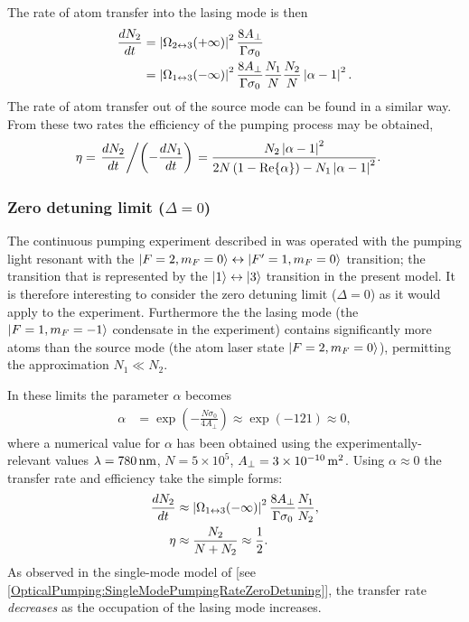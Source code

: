 The rate of atom transfer into the lasing mode is then
\begin{align}
    \frac{d N_2}{dt} &= \abs{\Omega_{2\leftrightarrow 3}(+\infty)}^2 \frac{8 A_\perp}{\Gamma \sigma_0} \\
     &= \abs{\Omega_{1\leftrightarrow 3}(-\infty)}^2 \frac{8 A_\perp}{\Gamma \sigma_0} \frac{N_1}{N} \frac{N_2}{N} \abs{\alpha - 1}^2. \label{OpticalPumping:OverlappingCondensates:TransferRate}
\end{align}
The rate of atom transfer out of the source mode can be found in a similar way.  From these two rates the efficiency of the pumping process may be obtained,
\begin{align}
    \eta &= \left.\frac{d N_2}{d t} \middle / \left(- \frac{d N_1}{dt}\right)\right. = \frac{N_2 \left|\alpha - 1\right|^2}{2 N \left(1 - \operatorname{Re}\{\alpha\}\right) - N_1 \left|\alpha -1\right|^2}.
\end{align}

\subsubsection{Zero detuning limit ($\Delta = 0$)}

The continuous pumping experiment described in  was operated with the pumping light resonant with the ${\left|F=2, m_F=0\right>} \leftrightarrow {\ensuremath{\left|F'=1, m_F=0\right>}}$ transition; the transition that is represented by the ${\left|1\right>} \leftrightarrow {\ensuremath{\left|3\right>}}$ transition in the present model.  It is therefore interesting to consider the zero detuning limit ($\Delta = 0$) as it would apply to the experiment.  Furthermore the the lasing mode (the ${\left|F=1, m_F=-1\right>}$ condensate in the experiment) contains significantly more atoms than the source mode (the atom laser state ${\left|F=2, m_F=0\right>}$), permitting the approximation $N_1 \ll N_2$.  

In these limits the parameter $\alpha$ becomes
\begin{align}
    \alpha &= \exp\left( - \frac{N \sigma_0}{4 A_\perp}\right) \approx \exp(- 121) \approx 0,
\end{align}
where a numerical value for $\alpha$ has been obtained using the experimentally-relevant values $\lambda = \unit[780]{nm}$, $N = 5 \times 10^5$, $A_\perp = 3\times\unit[10^{-10}]{m\textsuperscript{2}}$.  Using $\alpha \approx 0$ the transfer rate and efficiency take the simple forms:
\begin{align}
    \frac{d N_2}{dt} &\approx \abs{\Omega_{1\leftrightarrow 3}(-\infty)}^2 \frac{8 A_\perp}{\Gamma \sigma_0} \frac{N_1}{N_2}, \label{OpticalPumping:OverlappingCondensates:ZeroDetuningTransferRate}\\
    \eta &\approx \frac{N_2}{N + N_2} \approx \frac{1}{2} \label{OpticalPumping:OverlappingCondensates:ZeroDetuningEfficiency}.
\end{align}
As observed in the single-mode model of  [see \eqref{OpticalPumping:SingleModePumpingRateZeroDetuning}], the transfer rate \emph{decreases} as the occupation of the lasing mode increases.  

